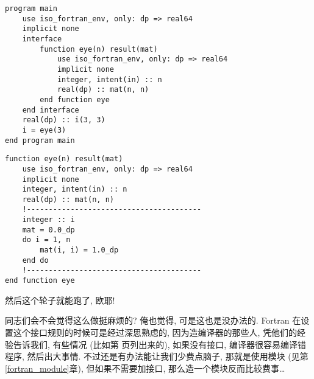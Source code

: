 \begin{lstlisting} 
program main
    use iso_fortran_env, only: dp => real64
    implicit none
    interface
        function eye(n) result(mat)
            use iso_fortran_env, only: dp => real64
            implicit none
            integer, intent(in) :: n
            real(dp) :: mat(n, n)
        end function eye
    end interface
    real(dp) :: i(3, 3)
    i = eye(3)
end program main
\end{lstlisting}
\begin{lstlisting}
function eye(n) result(mat)
    use iso_fortran_env, only: dp => real64
    implicit none
    integer, intent(in) :: n
    real(dp) :: mat(n, n)
    !----------------------------------------
    integer :: i
    mat = 0.0_dp
    do i = 1, n
        mat(i, i) = 1.0_dp
    end do
    !----------------------------------------
end function eye
\end{lstlisting} 
然后这个轮子就能跑了, 欧耶!

同志们会不会觉得这么做挺麻烦的? 俺也觉得, 可是这也是没办法的. Fortran 在设置这个接口规则的时候可是经过深思熟虑的, 因为造编译器的那些人, 凭他们的经验告诉我们, 有些情况 (比如第 \pageref{whether_specific_interface} 页列出来的), 如果没有接口, 编译器很容易编译错程序, 然后出大事情. 不过还是有办法能让我们少费点脑子, 那就是使用模块 (见第\ref{fortran_module}章), 但如果不需要加接口, 那么造一个模块反而比较费事\dots{}

